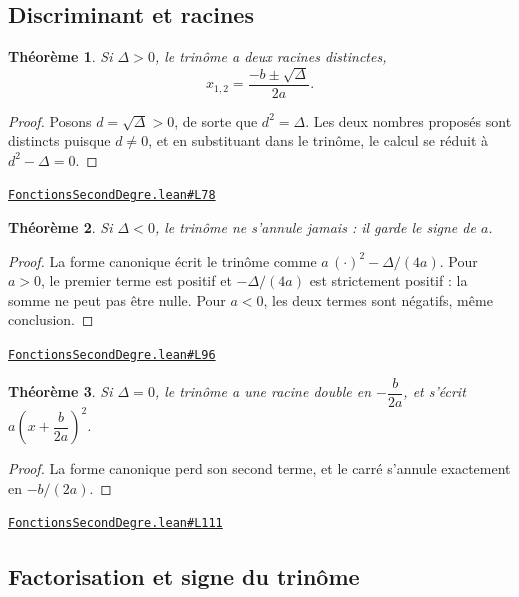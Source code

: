 \documentclass[11pt,a4paper]{article}
\theoremstyle{definition}
\theoremstyle{plain}
\newtheorem{theoreme}{Théorème}
\newcommand{\source}[2]{\par\smallskip\noindent\hfill{\footnotesize\href{#1}{\texttt{#2}}}\par\smallskip}
\begin{document}
\subsection{Discriminant et racines}

\begin{theoreme}
Si $\Delta > 0$, le trinôme a deux racines distinctes,
\[ x_{1,2} = \frac{-b \pm \sqrt{\Delta}}{2a} . \]
\end{theoreme}

\begin{proof}
Posons $d = \sqrt{\Delta} > 0$, de sorte que $d^2 = \Delta$. Les deux nombres proposés
sont distincts puisque $d \ne 0$, et en substituant dans le trinôme, le calcul se réduit à
$d^2 - \Delta = 0$.
\end{proof}
\source{https://github.com/Commutator-IO/learn-lean/blob/main/cours/02-lycee/02-fonctions-second-degre/FonctionsSecondDegre.lean\#L78}{FonctionsSecondDegre.lean\#L78}

\begin{theoreme}
Si $\Delta < 0$, le trinôme ne s'annule jamais : il garde le signe de $a$.
\end{theoreme}

\begin{proof}
La forme canonique écrit le trinôme comme $a\,(\cdot)^2 - \Delta/(4a)$. Pour $a > 0$, le
premier terme est positif et $-\Delta/(4a)$ est strictement positif : la somme ne peut pas
être nulle. Pour $a < 0$, les deux termes sont négatifs, même conclusion.
\end{proof}
\source{https://github.com/Commutator-IO/learn-lean/blob/main/cours/02-lycee/02-fonctions-second-degre/FonctionsSecondDegre.lean\#L96}{FonctionsSecondDegre.lean\#L96}

\begin{theoreme}
Si $\Delta = 0$, le trinôme a une racine double en $-\dfrac{b}{2a}$, et s'écrit
$a\left(x + \dfrac{b}{2a}\right)^2$.
\end{theoreme}

\begin{proof}
La forme canonique perd son second terme, et le carré s'annule exactement en
$-b/(2a)$.
\end{proof}
\source{https://github.com/Commutator-IO/learn-lean/blob/main/cours/02-lycee/02-fonctions-second-degre/FonctionsSecondDegre.lean\#L111}{FonctionsSecondDegre.lean\#L111}

\subsection{Factorisation et signe du trinôme}
\end{document}
